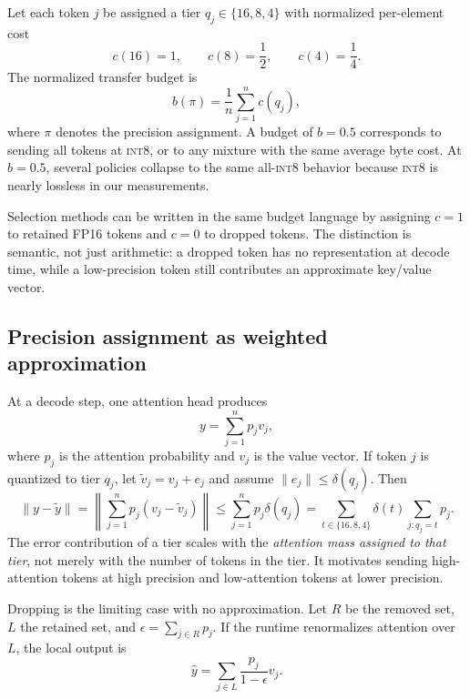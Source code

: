 \documentclass[11pt]{article}
\newcommand{\budget}{b}
\newcommand{\intviii}{\textsc{int8}}
\theoremstyle{plain}
\theoremstyle{definition}
\begin{document}
Let each token $j$ be assigned a tier $q_j\in\{16,8,4\}$ with normalized per-element cost
\begin{equation}
 c(16)=1,\qquad c(8)=\frac{1}{2},\qquad c(4)=\frac{1}{4}.
\end{equation}
The normalized transfer budget is
\begin{equation}
  \budget(\pi)=\frac{1}{n}\sum_{j=1}^n c(q_j),
  \label{eq:budget}
\end{equation}
where $\pi$ denotes the precision assignment.  A budget of $\budget=0.5$ corresponds to sending all tokens at \intviii{}, or to any mixture with the same average byte cost.  At $\budget=0.5$, several policies collapse to the same all-\intviii{} behavior because \intviii{} is nearly lossless in our measurements.

Selection methods can be written in the same budget language by assigning $c=1$ to retained FP16 tokens and $c=0$ to dropped tokens.  The distinction is semantic, not just arithmetic: a dropped token has no representation at decode time, while a low-precision token still contributes an approximate key/value vector.

\subsection{Precision assignment as weighted approximation}
At a decode step, one attention head produces
\begin{equation}
  y = \sum_{j=1}^{n} p_j v_j,
  \label{eq:attention-output}
\end{equation}
where $p_j$ is the attention probability and $v_j$ is the value vector.  If token $j$ is quantized to tier $q_j$, let $\tilde v_j=v_j+e_j$ and assume $\|e_j\|\le \delta(q_j)$.  Then
\begin{equation}
  \|y-\tilde y\|
  =\left\|\sum_{j=1}^{n}p_j(v_j-\tilde v_j)\right\|
  \le \sum_{j=1}^{n}p_j\delta(q_j)
  =\sum_{t\in\{16,8,4\}} \delta(t)\sum_{j:q_j=t}p_j .
  \label{eq:quant-bound}
\end{equation}
The error contribution of a tier scales with the \emph{attention mass assigned to that tier}, not merely with the number of tokens in the tier.  It motivates sending high-attention tokens at high precision and low-attention tokens at lower precision.

Dropping is the limiting case with no approximation.  Let $R$ be the removed set, $L$ the retained set, and $\epsilon=\sum_{j\in R}p_j$.  If the runtime renormalizes attention over $L$, the local output is
\begin{equation}
  \hat y=\sum_{j\in L}\frac{p_j}{1-\epsilon}v_j .
\end{equation}
\end{document}
